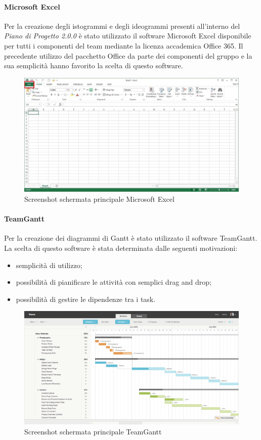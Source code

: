 \paragraph{Microsoft Excel}
Per la creazione degli istogrammi e degli ideogrammi presenti all'interno del \textit{Piano di Progetto 2.0.0\doc} è stato utilizzato il software Microsoft Excel disponibile per tutti i componenti del team mediante la licenza accademica Office 365. Il precedente utilizzo del pacchetto Office da parte dei componenti del gruppo e la sua semplicità hanno favorito la scelta di questo software.
\begin{figure}[h!]
	\caption{Screenshot schermata principale Microsoft Excel}
	\centering
	\includegraphics[width=\textwidth]{res/img/excelScreenshot.jpg}
\end{figure}
\newpage
\paragraph{TeamGantt}
Per la creazione dei diagrammi di Gantt è stato utilizzato il software TeamGantt. La scelta di questo software è stata determinata dalle seguenti motivazioni:
\begin{itemize}
	\item semplicità di utilizzo;
	\item possibilità di pianificare le attività con semplici drag and drop;
	\item possibilità di gestire le dipendenze tra i task.
\end{itemize}
\begin{figure}[h!]
	\caption{Screenshot schermata principale TeamGantt}
	\centering
	\includegraphics[width=\textwidth]{res/img/teamganttScreenshot.png}
\end{figure}
